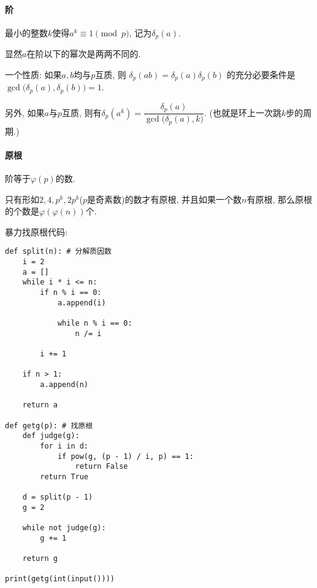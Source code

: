 \paragraph{阶} 最小的整数$k$使得$a ^ k \equiv 1 \pmod p$, 记为$\delta_p(a)$.

显然$a$在阶以下的幂次是两两不同的.

一个性质: 如果$a, b$均与$p$互质, 则 $ \delta_p(ab)=\delta_p(a)\delta_p(b) $ 的充分必要条件是$ \gcd\big(\delta_p(a),\delta_p(b)\big)=1 $.

另外, 如果$a$与$p$互质, 则有$ \delta_p(a^k)=\dfrac{\delta_p(a)}{\gcd\big(\delta_p(a),k\big)} $. (也就是环上一次跳$k$步的周期.)

\paragraph{原根} 阶等于$\varphi(p)$的数.

只有形如$2, 4, p ^ k, 2 p ^ k$($p$是奇素数)的数才有原根, 并且如果一个数$n$有原根, 那么原根的个数是$\varphi(\varphi(n))$个.

暴力找原根代码:
\begin{verbatim}
def split(n): # 分解质因数
    i = 2
    a = []
    while i * i <= n:
        if n % i == 0:
            a.append(i)

            while n % i == 0:
                n /= i

        i += 1

    if n > 1:
        a.append(n)

    return a
    
def getg(p): # 找原根
    def judge(g):
        for i in d:
            if pow(g, (p - 1) / i, p) == 1:
                return False
        return True

    d = split(p - 1)
    g = 2

    while not judge(g):
        g += 1

    return g

print(getg(int(input())))
\end{verbatim}